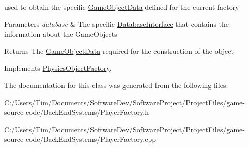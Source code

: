 used to obtain the specific \hyperlink{struct_game_object_data}{Game\+Object\+Data} defined for the current factory 


\begin{DoxyParams}{Parameters}
{\em database} & The specific \hyperlink{class_database_interface}{Database\+Interface} that contains the information about the Game\+Objects \\
\hline
\end{DoxyParams}
\begin{DoxyReturn}{Returns}
The \hyperlink{struct_game_object_data}{Game\+Object\+Data} required for the construction of the object 
\end{DoxyReturn}


Implements \hyperlink{class_physics_object_factory_aa59f52d3adc1fac676f4a8a3c2de9ba9}{Physics\+Object\+Factory}.



The documentation for this class was generated from the following files\+:\begin{DoxyCompactItemize}
\item 
C\+:/\+Users/\+Tim/\+Documents/\+Software\+Dev/\+Software\+Project/\+Project\+Files/game-\/source-\/code/\+Back\+End\+Systems/Player\+Factory.\+h\item 
C\+:/\+Users/\+Tim/\+Documents/\+Software\+Dev/\+Software\+Project/\+Project\+Files/game-\/source-\/code/\+Back\+End\+Systems/Player\+Factory.\+cpp\end{DoxyCompactItemize}
